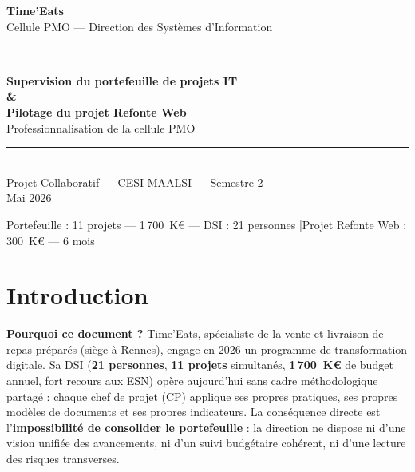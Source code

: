 \documentclass[11pt,a4paper,oneside]{report}
\begin{document}
\small

\begin{titlepage}
  \pagecolor{cnNavy}
  \color{white}
  \vspace*{2.5cm}
  \begin{center}
    {\Huge\bfseries Time'Eats}\\[0.5cm]
    {\normalsize\textcolor{cnSlate} Cellule PMO --- Direction des Systèmes d'Information}\\[2cm]
    \textcolor{cnOrange}{\rule{12cm}{1.5pt}}\\[1cm]
    {\LARGE\bfseries Supervision du portefeuille de projets IT}\\[0.4cm]
    {\Large\bfseries\&}\\[0.4cm]
    {\LARGE\bfseries Pilotage du projet Refonte Web}\\[0.8cm]
    {\large Professionnalisation de la cellule PMO}\\[1cm]
    \textcolor{cnOrange}{\rule{12cm}{1.5pt}}\\[2cm]
    {\normalsize Projet Collaboratif --- CESI MAALSI --- Semestre 2}\\[0.4cm]
    {\normalsize Mai 2026}
  \end{center}
  \vfill
  \begin{center}
    \small\textcolor{cnSlate}{Portefeuille : 11 projets --- 1\,700~K€ --- DSI : 21 personnes \quad|\quad Projet Refonte Web : 300~K€ --- 6 mois}
  \end{center}
\end{titlepage}
\nopagecolor

\tableofcontents
\newpage

\chapter*{Introduction}

\textbf{Pourquoi ce document ?} Time'Eats, spécialiste de la vente et livraison de repas préparés (siège à Rennes), engage en 2026 un programme de transformation digitale. Sa DSI (\textbf{21 personnes}, \textbf{11 projets} simultanés, \textbf{1\,700~K€} de budget annuel, fort recours aux ESN) opère aujourd'hui sans cadre méthodologique partagé : chaque chef de projet (CP) applique ses propres pratiques, ses propres modèles de documents et ses propres indicateurs. La conséquence directe est l'\textbf{impossibilité de consolider le portefeuille} : la direction ne dispose ni d'une vision unifiée des avancements, ni d'un suivi budgétaire cohérent, ni d'une lecture des risques transverses.
\end{document}

